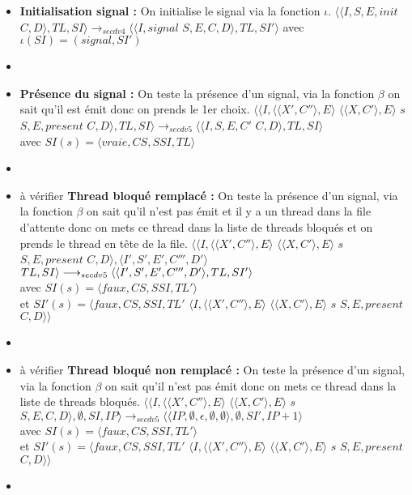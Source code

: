 \documentclass[10pt,a4paper]{article}
\begin{document}
\begin{enumerate}
\begin{itemize}
				\item[] \textbf{Initialisation signal :} On initialise le signal via la fonction $\iota$.
				\smallbreak 
				$\langle\langle I,S,E,init$ $C,D\rangle,TL,SI\rangle 
				\longrightarrow_{secdv4}
				\langle\langle I,signal$ $S,E,C,D\rangle,TL,SI'\rangle$
				avec $\iota(SI) = (signal,SI')$
				\item[]	
				
				\item[] \textbf{Présence du signal :} On teste la présence d'un signal, via la fonction $\beta$ on sait qu'il est émit donc on prends le 1er choix.
				\smallbreak
				$\langle\langle I,\langle\langle X',C''\rangle,E\rangle$ $\langle\langle X,C'\rangle,E\rangle$ $s$ $S,E,present$ $C,D\rangle,TL,SI\rangle 
				\longrightarrow_{secdv5} 
				\langle\langle I,S,E,C'$ $C,D\rangle,TL,SI\rangle$ 
				\\avec $SI(s) = \langle vraie,CS,SSI,TL\rangle$
				\item[]
				
				
				\item[] à vérifier\textbf{ Thread bloqué remplacé :} On teste la présence d'un signal, via la fonction $\beta$ on sait qu'il n'est pas émit et il y a un thread dans la file d'attente
				donc on mets ce thread dans la liste de threads bloqués et on prends le thread en tête de la file.
				\smallbreak
				$\langle\langle I,\langle\langle X',C''\rangle,E\rangle$ $\langle\langle X,C'\rangle,E\rangle$ $s$ $S,E,present$ $C,D\rangle,\langle I',S',E',C''',D'\rangle$ $TL,SI\rangle 
				\\\longrightarrow_{secdv5} 
				\langle\langle I',S',E',C''',D'\rangle,TL,SI'\rangle$ 
				\\avec $SI(s) = \langle faux,CS,SSI,TL'\rangle$
				\\et $SI'(s) = \langle faux,CS,SSI,TL'$ $\langle I,\langle\langle X',C''\rangle,E\rangle$ $\langle\langle X,C'\rangle,E\rangle$ $s$ $S,E,present$ $C,D\rangle\rangle$
				\item[]	
				
				\item[] à vérifier \textbf{Thread bloqué non remplacé :} On teste la présence d'un signal, via la fonction $\beta$ on sait qu'il n'est pas émit donc on mets ce thread dans la liste de threads bloqués.
				\smallbreak 
				$\langle\langle I,\langle\langle X',C''\rangle,E\rangle$ $\langle\langle X,C'\rangle,E\rangle$ $s$ $S,E,C,D\rangle,\emptyset,SI,IP\rangle 
				\longrightarrow_{secdv5} 
				\langle\langle IP,\emptyset,\epsilon,\emptyset,\emptyset\rangle,\emptyset,SI',IP+1\rangle$
				\\avec $SI(s) = \langle faux,CS,SSI,TL'\rangle$
				\\et $SI'(s) = \langle faux,CS,SSI,TL'$ $\langle I,\langle\langle X',C''\rangle,E\rangle$ $\langle\langle X,C'\rangle,E\rangle$ $s$ $S,E,present$ $C,D\rangle\rangle$
				\item[]
				

\end{itemize}
\end{enumerate}
\end{document}
